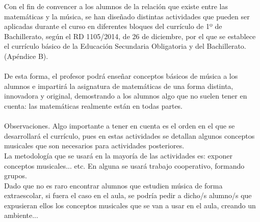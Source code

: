 \documentclass[a4paper, openright, 11pt, titlepage]{report}
\theoremstyle{definition}\newtheorem{defin}[propo]{Definition}
\theoremstyle{definition}\newtheorem{obser}[propo]{Remark}
\theoremstyle{definition}\newtheorem{ejem}[propo]{Ejemplo}
\theoremstyle{definition}\newtheorem{algoritmo}[propo]{Algoritmo}
\begin{document}
Con el fin de convencer a los alumnos de la relación que existe entre las matemáticas y la música, se han diseñado distintas actividades que pueden ser aplicadas durante el curso en diferentes bloques del currículo de 1º de Bachillerato, según el RD 1105/2014, de 26 de diciembre, por el que se establece el currículo básico de la Educación Secundaria Obligatoria y del Bachillerato. (Apéndice B).\\\\
De esta forma, el profesor podrá enseñar conceptos básicos de música a los alumnos e impartirá la asignatura de matemáticas de una forma distinta, innovadora y original, demostrando a los alumnos algo que no suelen tener en cuenta: las matemáticas realmente están en todas partes.\\\\
Observaciones. Algo importante a tener en cuenta es el orden en el que se desarrollará el currículo, pues en estas actividades se detallan algunos conceptos musicales que son necesarios para actividades posteriores.\\
La metodología que se usará en la mayoría de las actividades es: exponer conceptos musicales... etc. En alguna se usará trabajo cooperativo, formando grupos. \\
Dado que no es raro encontrar alumnos que estudien música de forma extraescolar, si fuera el caso en el aula, se podría pedir a dicho/s alumno/s que expusieran ellos los conceptos musicales que se van a usar en el aula, creando un ambiente...

\end{document}
